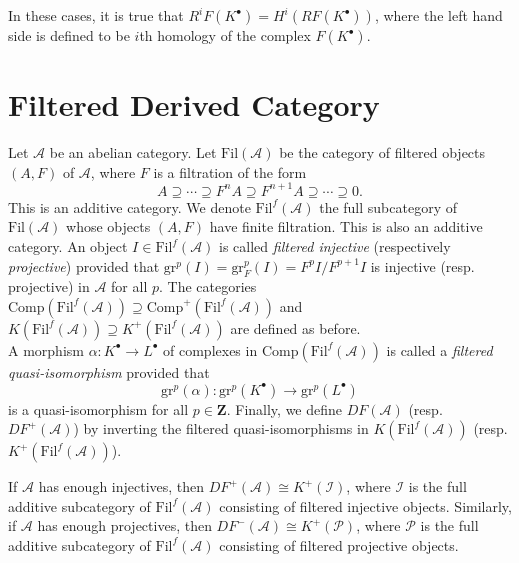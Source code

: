 \begin{remark} 
In these cases, it is true that $R^iF(K^\bullet) = H^i(RF(K^\bullet))$, where 
the left hand side is defined to be $i$th homology of the complex 
$F(K^\bullet)$.  
\end{remark}

\section{Filtered Derived Category}

\begin{definition}
Let $\mathcal{A}$ be an abelian category. Let $\text{Fil}(\mathcal{A})$ be the 
category of filtered objects $(A,F)$ of $\mathcal{A}$, where $F$ is a 
filtration of the form
$$
A \supseteq \cdots \supseteq F^n A \supseteq F^{n+1}A \supseteq \cdots 
\supseteq 0.
$$
This is an additive category. We denote $\text{Fil}^f(\mathcal{A})$ the full 
subcategory of $\text{Fil}(\mathcal{A})$ whose objects $(A,F)$ have finite 
filtration.  This is also an additive category. An object $I \in 
\text{Fil}^f(\mathcal{A})$ is called {\it filtered injective} (respectively 
{\it projective}) provided that $\text{gr}^p(I) = \text{gr}_F^p(I) = 
F^pI/F^{p+1}I$ is injective (resp. projective) in $\mathcal{A}$ for all $p$. 
The categories $\text{Comp}(\text{Fil}^f(\mathcal{A})) \supseteq 
\text{Comp}^+(\text{Fil}^f(\mathcal{A}))$ and $K(\text{Fil}^f(\mathcal{A})) 
\supseteq K^+(\text{Fil}^f(\mathcal A))$ are defined as before.
\\
A morphism $\alpha : K^\bullet \to L^\bullet$ of complexes in 
$\text{Comp}(\text{Fil}^f(\mathcal{A}))$ is called a {\it filtered 
quasi-isomorphism} provided that 
$$
\mathrm{gr}^p(\alpha): \mathrm{gr}^p(K^\bullet) \to \mathrm{gr}^p(L^\bullet)
$$ 
is a quasi-isomorphism for all $p \in \mathbf{Z}$. Finally, we define $D 
F(\mathcal{A})$ (resp. $D F^+(\mathcal{A})$) by inverting the filtered 
quasi-isomorphisms in $K(\text{Fil}^f(\mathcal{A}))$ (resp. 
$K^+(\text{Fil}^f(\mathcal{A}))$). 
\end{definition}

\begin{lemma}
If $\mathcal{A}$ has enough injectives, then $D F^+(\mathcal{A}) \cong 
K^+(\mathcal{I})$, where $\mathcal{I}$ is the full additive subcategory of 
$\text{Fil}^f(\mathcal{A})$ consisting of filtered injective objects. 
Similarly, if $\mathcal{A}$ has enough projectives, then $D F^-(\mathcal{A}) 
\cong K^+(\mathcal{P})$, where $\mathcal P$ is the full additive subcategory of 
$\text{Fil}^f(\mathcal{A})$ consisting of filtered projective objects.
\end{lemma}

